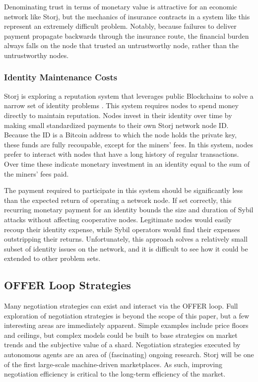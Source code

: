 \documentclass[a4paper,10pt]{article}
\begin{document}
Denominating trust in terms of monetary value is attractive for an economic
network like Storj, but the mechanics of insurance contracts in a system like
this represent an extremely difficult problem. Notably, because failures to
deliver payment propagate backwards through the insurance route, the financial
burden always falls on the node that trusted an untrustworthy node, rather than
the untrustworthy nodes.

\subsubsection{Identity Maintenance Costs}
Storj is exploring a reputation system that leverages public Blockchains to
solve a narrow set of identity problems \cite{23}. This system requires nodes to
spend money directly to maintain reputation. Nodes invest in their identity over
time by making small standardized payments to their own Storj network node ID.
Because the ID is a Bitcoin address to which the node holds the private key,
these funds are fully recoupable, except for the miners’ fees. In this system,
nodes prefer to interact with nodes that have a long history of regular
transactions. Over time these indicate monetary investment in an identity equal
to the sum of the miners’ fees paid.

The payment required to participate in this system should be significantly less
than the expected return of operating a network node. If set correctly, this
recurring monetary payment for an identity bounds the size and duration of Sybil
attacks without affecting cooperative nodes. Legitimate nodes would easily
recoup their identity expense, while Sybil operators would find their expenses
outstripping their returns. Unfortunately, this approach solves a relatively
small subset of identity issues on the network, and it is difficult to see how
it could be extended to other problem sets.

\subsection{OFFER Loop Strategies}
Many negotiation strategies can exist and interact via the OFFER loop. Full
exploration of negotiation strategies is beyond the scope of this paper, but a
few interesting areas are immediately apparent. Simple examples include price
floors and ceilings, but complex models could be built to base strategies on
market trends and the subjective value of a shard. Negotiation strategies
executed by autonomous agents are an area of (fascinating) ongoing research.
Storj will be one of the first large-scale machine-driven marketplaces. As such,
improving negotiation efficiency is critical to the long-term efficiency of the
market.
\end{document}
